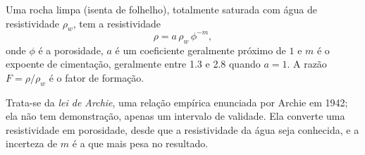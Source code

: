 \begin{proposition}\label{prop:b3:field-lab-methods-3:archie}
Uma rocha limpa (isenta de folhelho), totalmente saturada com água de
resistividade $\rho_w$, tem a resistividade
\[
\rho = a\,\rho_w\,\phi^{-m} ,
\]
onde $\phi$ é a porosidade, $a$ é um coeficiente geralmente próximo de $1$
e $m$ é o expoente de cimentação, geralmente entre \num{1.3} e
\num{2.8} quando $a = 1$. A razão $F = \rho/\rho_w$ é o fator de
formação.
\end{proposition}
Trata-se da \emph{lei de Archie}, uma relação
empírica enunciada por Archie em 1942; ela não tem demonstração, apenas um intervalo de validade. Ela converte uma resistividade em porosidade, desde que
a resistividade da água seja conhecida, e a incerteza de $m$ é a que mais pesa no resultado.

